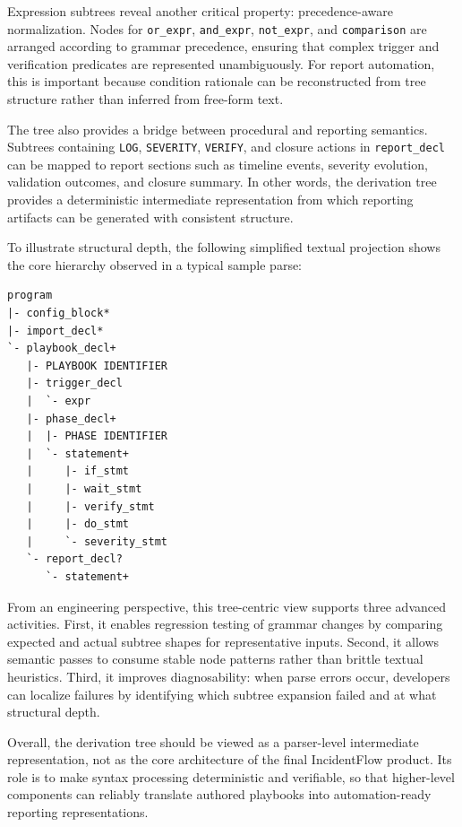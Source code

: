 Expression subtrees reveal another critical property: precedence-aware normalization. Nodes for \texttt{or\_expr}, \texttt{and\_expr}, \texttt{not\_expr}, and \texttt{comparison} are arranged according to grammar precedence, ensuring that complex trigger and verification predicates are represented unambiguously. For report automation, this is important because condition rationale can be reconstructed from tree structure rather than inferred from free-form text.

The tree also provides a bridge between procedural and reporting semantics. Subtrees containing \texttt{LOG}, \texttt{SEVERITY}, \texttt{VERIFY}, and closure actions in \texttt{report\_decl} can be mapped to report sections such as timeline events, severity evolution, validation outcomes, and closure summary. In other words, the derivation tree provides a deterministic intermediate representation from which reporting artifacts can be generated with consistent structure.

To illustrate structural depth, the following simplified textual projection shows the core hierarchy observed in a typical sample parse:

\begin{lstlisting}
program
|- config_block*
|- import_decl*
`- playbook_decl+
   |- PLAYBOOK IDENTIFIER
   |- trigger_decl
   |  `- expr
   |- phase_decl+
   |  |- PHASE IDENTIFIER
   |  `- statement+
   |     |- if_stmt
   |     |- wait_stmt
   |     |- verify_stmt
   |     |- do_stmt
   |     `- severity_stmt
   `- report_decl?
      `- statement+
\end{lstlisting}

From an engineering perspective, this tree-centric view supports three advanced activities. First, it enables regression testing of grammar changes by comparing expected and actual subtree shapes for representative inputs. Second, it allows semantic passes to consume stable node patterns rather than brittle textual heuristics. Third, it improves diagnosability: when parse errors occur, developers can localize failures by identifying which subtree expansion failed and at what structural depth.

Overall, the derivation tree should be viewed as a parser-level intermediate representation, not as the core architecture of the final IncidentFlow product. Its role is to make syntax processing deterministic and verifiable, so that higher-level components can reliably translate authored playbooks into automation-ready reporting representations.
